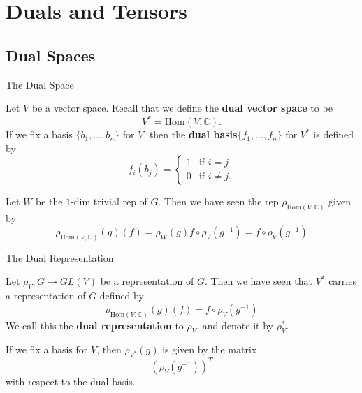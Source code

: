 \section{Duals and Tensors}
\subsection{Dual Spaces}
\begin{frame}{The Dual Space}
\begin{definition}
Let $V$ be a vector space.  Recall that we define the \textbf{dual vector space} to be
\[ V^{*} = \text{Hom}(V,\mathbb{C}).\]  If we fix a basis  $\{ b_1, \ldots, b_n \} $ for $V$, then the \textbf{dual basis}$\{ f_1, \ldots, f_n \}$ for $V^*$ is defined by
\[ f_i (b_j) = \begin{cases} 1 &\text{if } i=j \\ 0 &\text{if } i \neq j.  \end{cases} \]
\end{definition}
\end{frame}
\begin{note}
Let $W$ be the $1$-dim trivial rep of $G$.  Then we have seen the rep  $\rho_{\text{Hom}(V,\mathbb{C})}$ given by 
\[ \rho_{\text{Hom}(V,\mathbb{C})} (g) (f) = \rho_W (g) f \circ \rho_V ( g^{-1})= f \circ \rho_V ( g^{-1}) \]
\end{note}


\begin{frame}{The Dual Representation}
\begin{definition}
Let $\rho_V \colon G \to GL(V)$ be a representation of $G$. Then we have seen that $V^{*}$ carries a representation of $G$ defined by
\[ \rho_{\text{Hom}(V,\mathbb{C})} (g) (f) = f \circ \rho_V ( g^{-1}) \]
We call this the \textbf{dual representation} to $\rho_V$, and denote it by $\rho_V^{*}$.
\end{definition}
\begin{proposition}
 If we fix a basis for $V$, then $\rho_{V^*}(g)$ is given by the matrix 
\[( \rho_V (g^{-1}) )^T \]
with respect to the dual basis.
\end{proposition}
\end{frame}

